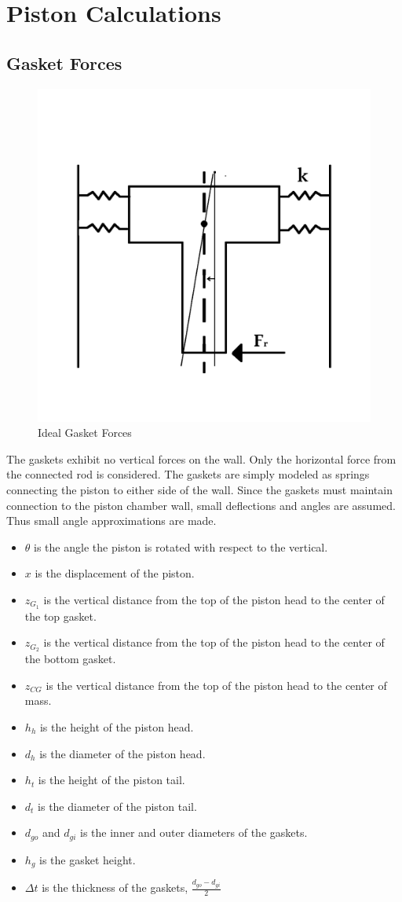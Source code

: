 \documentclass[10pt,a4paper]{article}
\begin{document}
\section*{Piston Calculations}
\subsection*{Gasket Forces}
	\begin{figure}[h]
		\centering
		\includegraphics[width=.75\textwidth]{PistonDiagram.png}
		\caption{Ideal Gasket Forces}
		\label{fig:diagram1}
	\end{figure}
	The gaskets exhibit no vertical forces on the wall. Only the horizontal force from the connected rod is considered.
	The gaskets are simply modeled as springs connecting the piston to either side of the wall. Since the gaskets must maintain connection to the piston chamber wall, small deflections and angles are assumed. Thus small angle approximations are made.
	\begin{itemize}
	\item $\theta$ is the angle the piston is rotated with respect to the vertical.
	\item $x$ is the displacement of the piston.
	\item $z_{G_1}$ is the vertical distance from the top of the piston head to the center of the top gasket.
	\item $z_{G_2}$ is the vertical distance from the top of the piston head to the center of the bottom gasket.
	\item $z_{CG}$ is the vertical distance from the top of the piston head to the center of mass.
	\item $h_h$ is the height of the piston head.
	\item $d_h$ is the diameter of the piston head.
	\item $h_t$ is the height of the piston tail.
	\item $d_t$ is the diameter of the piston tail.
	\item $d_{go}$ and $d_{gi}$ is the inner and outer diameters of the gaskets.
	\item $h_g$ is the gasket height.
	\item $\Delta t$ is the thickness of the gaskets, $\frac{d_{go}-d_{gi}}{2} $
	\end{itemize}
\end{document}
